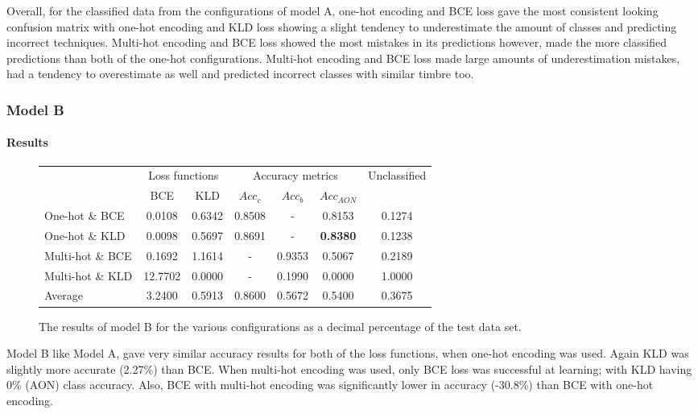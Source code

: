 \documentclass[12pt]{article}
\begin{document}
	Overall, for the classified data from the configurations of model A, one-hot encoding and BCE loss gave the most consistent looking confusion matrix with one-hot encoding and KLD loss showing a slight tendency to underestimate the amount of classes and predicting incorrect techniques. Multi-hot encoding and BCE loss showed the most mistakes in its predictions however, made the more classified predictions than both of the one-hot configurations. Multi-hot encoding and BCE loss made large amounts of underestimation mistakes, had a tendency to overestimate as well and predicted incorrect classes with similar timbre too.
	
	\subsubsection{Model B}
	\label{sec:evaluation_analysis_modelB}
	
	\paragraph*{Results}
	
	\begin{figure}[H]
	    \centering
	    \begin{tabular}{l|c|c|c|c|c|c|}
	        & \multicolumn{2}{c|}{Loss functions} & \multicolumn{3}{c|}{Accuracy metrics} & \multirow{2}{*}{Unclassified}\\
	        \cline{2-6}
	        & BCE & KLD & $Acc_{c}$ & $Acc_{b}$ & $Acc_{AON}$ &\\
	        \hline
	        One-hot \& BCE & 0.0108 & 0.6342 & 0.8508 & - & 0.8153 & 0.1274\\
	        \hline
	        One-hot \& KLD & 0.0098 & 0.5697 & 0.8691 & - & \textbf{0.8380} & 0.1238\\
	        \hline
	        Multi-hot \& BCE & 0.1692 & 1.1614 & - & 0.9353 & 0.5067 & 0.2189\\
	        \hline
	        Multi-hot \& KLD & 12.7702 & 0.0000 & - & 0.1990 & 0.0000 & 1.0000\\
	        \bottomrule
	        Average & 3.2400 & 0.5913 & 0.8600 & 0.5672 & 0.5400 & 0.3675\\
	       \bottomrule
	    \end{tabular}
	    \caption{The results of model B for the various configurations as a decimal percentage of the test data set.}
	    \label{fig:modelB}
	\end{figure}
	
	Model B like Model A, gave very similar accuracy results for both of the loss functions, when one-hot encoding was used. Again KLD was slightly more accurate (2.27\%) than BCE. When multi-hot encoding was used, only BCE loss was successful at learning; with KLD having 0\% (AON) class accuracy. Also, BCE with multi-hot encoding was significantly lower in accuracy (-30.8\%) than BCE with one-hot encoding.
	
\end{document}
